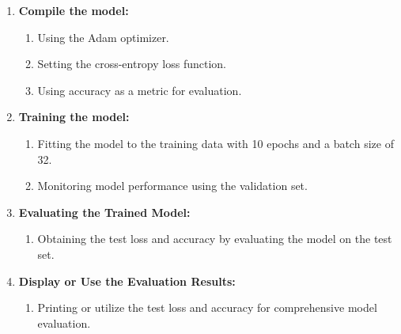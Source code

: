 \begin{enumerate}
    \item \textbf{Compile the model:}
          \begin{enumerate}
             \item Using the Adam optimizer.
             \item Setting the cross-entropy loss function.
             \item Using accuracy as a metric for evaluation.
          \end{enumerate}
 
    \item \textbf{Training the model:}
          \begin{enumerate}
             \item Fitting the model to the training data with 10 epochs and a batch size of 32.
             \item Monitoring model performance using the validation set.
          \end{enumerate}
 
    \item \textbf{Evaluating the Trained Model:}
          \begin{enumerate}
             \item Obtaining the test loss and accuracy by evaluating the model on the test set.
          \end{enumerate}
 
    \item \textbf{Display or Use the Evaluation Results:}
          \begin{enumerate}
             \item Printing or utilize the test loss and accuracy for comprehensive model evaluation.
          \end{enumerate}
 \end{enumerate}
 



